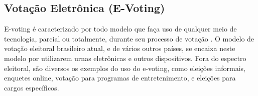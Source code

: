 \documentclass[portuguese]{textolivre}
\begin{document}
		
	
	
	
	
	\subsection{Votação Eletrônica (E-Voting)}
	
	E-voting é caracterizado por todo modelo que faça uso de qualquer meio de tecnologia, parcial ou totalmente, durante seu processo de votação  \cite{10061373, 9812616}. O modelo de votação eleitoral brasileiro atual, e de vários outros países, se encaixa neste modelo por utilizarem urnas eletrônicas e outros dispositivos. Fora do espectro eleitoral, são diversos os exemplos do uso do e-voting, como eleições informais, enquetes online, votação para programas de entretenimento, e eleições para cargos específicos.
	
	
\end{document}
